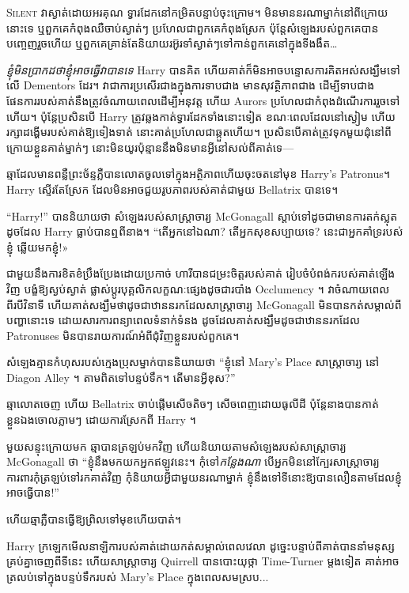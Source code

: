 
\lettrine{S}{ilent} វាស្ងាត់ដោយអរគុណ ទ្វារដែកនៅកម្រិតបន្ទាប់ចុះក្រោម។ មិនមាននរណាម្នាក់នៅពីក្រោយនោះទេ ឬពួកគេកំពុងឈឺចាប់ស្ងាត់ៗ ប្រហែលជាពួកគេកំពុងស្រែក ប៉ុន្តែសំឡេងរបស់ពួកគេបានបញ្ចេញរួចហើយ ឬពួកគេគ្រាន់តែនិយាយរអ៊ូរទាំស្ងាត់ៗទៅកាន់ពួកគេនៅក្នុងទីងងឹត…

\emph{ខ្ញុំ​មិន​ប្រាកដ​ថា​ខ្ញុំ​អាច​ធ្វើ​វា​បាន​ទេ} Harry បាន​គិត ហើយ​គាត់​ក៏​មិន​អាច​បន្ទោស​ការ​គិត​អស់​សង្ឃឹម​ទៅ​លើ Dementors ដែរ។ វាជាការប្រសើរជាងក្នុងការទាបជាង មានសុវត្ថិភាពជាង ដើម្បីទាបជាង ផែនការរបស់គាត់នឹងត្រូវចំណាយពេលដើម្បីអនុវត្ត ហើយ Aurors ប្រហែលជាកំពុងដំណើរការរួចទៅហើយ។ ប៉ុន្តែប្រសិនបើ Harry ត្រូវឆ្លងកាត់ទ្វារដែកទាំងនោះទៀត ខណៈពេលដែលនៅស្ងៀម ហើយរក្សាដង្ហើមរបស់គាត់ឱ្យទៀងទាត់ នោះគាត់ប្រហែលជាឆ្កួតហើយ។ ប្រសិន​បើ​គាត់​ត្រូវ​ទុក​មួយ​ដុំ​នៅ​ពី​ក្រោយ​ខ្លួន​គាត់​ម្នាក់​ៗ នោះ​មិន​យូរ​ប៉ុន្មាន​នឹង​មិន​មាន​អ្វី​នៅ​សល់​ពី​គាត់​ទេ—

ឆ្មា​ដែល​មាន​ពន្លឺ​ព្រះច័ន្ទ​ភ្លឺ​បាន​លោត​ចូល​ទៅ​ក្នុង​អត្ថិភាព​ហើយ​ចុះ​ចត​នៅ​មុខ​ Harry's Patronus។ Harry ស្ទើរតែស្រែក ដែលមិនអាចជួយរូបភាពរបស់គាត់ជាមួយ Bellatrix បានទេ។

“Harry!” បាននិយាយថា សំឡេងរបស់សាស្រ្តាចារ្យ McGonagall ស្តាប់ទៅដូចជាមានការតក់ស្លុត ដូចដែល Harry ធ្លាប់បានឮពីនាង។ “តើអ្នកនៅឯណា? តើអ្នកសុខសប្បាយទេ? នេះ​ជា​អ្នក​គាំទ្រ​របស់​ខ្ញុំ ឆ្លើយ​មក​ខ្ញុំ!»

ជាមួយនឹងការខិតខំប្រឹងប្រែងដោយប្រកាច់ ហារីបានជម្រះចិត្តរបស់គាត់ រៀបចំបំពង់ករបស់គាត់ឡើងវិញ បង្ខំឱ្យស្ងប់ស្ងាត់ ផ្លាស់ប្តូរបុគ្គលិកលក្ខណៈផ្សេងដូចជារបាំង Occlumency ។ វាចំណាយពេលពីរបីវិនាទី ហើយគាត់សង្ឃឹមថាដូចជាឋាននរកដែលសាស្រ្តាចារ្យ McGonagall មិនបានកត់សម្គាល់ពីបញ្ហានោះទេ ដោយសារការពន្យាពេលទំនាក់ទំនង ដូចដែលគាត់សង្ឃឹមដូចជាឋាននរកដែល Patronuses មិនបានរាយការណ៍អំពីជុំវិញខ្លួនរបស់ពួកគេ។

សំឡេង​គ្មាន​កំហុស​របស់​ក្មេង​ប្រុស​ម្នាក់​បាន​និយាយ​ថា “ខ្ញុំ​នៅ Mary's Place សាស្ត្រាចារ្យ នៅ Diagon Alley ។ តាមពិតទៅបន្ទប់ទឹក។ តើមានអ្វីខុស?”

ឆ្មាលោតចេញ ហើយ Bellatrix ចាប់ផ្តើមសើចតិចៗ សើចពេញដោយធូលីដី ប៉ុន្តែនាងបានកាត់ខ្លួនឯងចោលភ្លាមៗ ដោយការស្រែកពី Harry ។

មួយ​សន្ទុះ​ក្រោយ​មក ឆ្មា​បាន​ត្រឡប់​មក​វិញ ហើយ​និយាយ​តាម​សំឡេង​របស់​សាស្ត្រាចារ្យ McGonagall ថា “ខ្ញុំ​នឹង​មក​យក​អ្នក​ឥឡូវ​នេះ។ កុំទៅ\emph{កន្លែងណា} បើអ្នកមិននៅក្បែរសាស្រ្តាចារ្យការពារកុំត្រឡប់ទៅរកគាត់វិញ កុំនិយាយអ្វីជាមួយនរណាម្នាក់ ខ្ញុំនឹងទៅទីនោះឱ្យបានលឿនតាមដែលខ្ញុំអាចធ្វើបាន!”

ហើយឆ្មាភ្លឺបានធ្វើឱ្យព្រិលទៅមុខហើយបាត់។

Harry ក្រឡេកមើលនាឡិការបស់គាត់ដោយកត់សម្គាល់ពេលវេលា ដូច្នេះបន្ទាប់ពីគាត់បាននាំមនុស្សគ្រប់គ្នាចេញពីទីនេះ ហើយសាស្រ្តាចារ្យ Quirrell បានបោះយុថ្កា Time-Turner ម្តងទៀត គាត់អាចត្រលប់ទៅក្នុងបន្ទប់ទឹករបស់ Mary's Place ក្នុងពេលសមស្រប...

